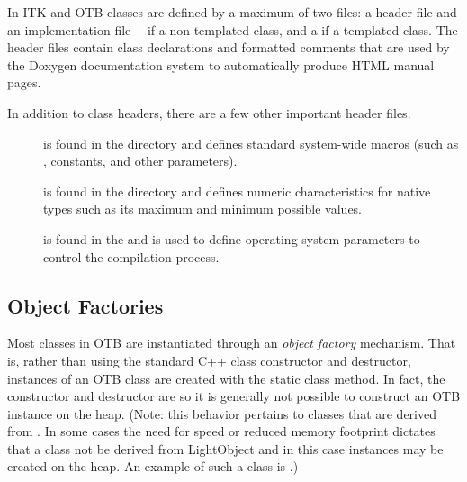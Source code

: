In ITK and OTB classes are defined by a maximum of two files: a header  file
and an implementation file--- if a non-templated class, and a
 if a templated class.
The header files contain class declarations
and formatted comments that are used by the Doxygen documentation
system to automatically produce HTML manual pages.

In addition to class headers, there are a few other important header files.
\begin{description}
        \item[] is found in the
         directory
        and defines standard system-wide macros (such as ,
        constants, and other parameters).

        \item[] is found in the 
        directory and defines numeric characteristics for native types such
        as its maximum and minimum possible values.

        \item[] is found in the 
        and is used to define operating system parameters to control
        the compilation process.
\end{description}

\subsection{Object Factories}
\label{sec:ObjectFactories}


Most classes in OTB are instantiated through an \emph{object factory}
mechanism. That is, rather than using the standard C++ class constructor and
destructor, instances of an OTB class are created with the static class
 method. In fact, the constructor and destructor are
 so it is generally not possible to construct an OTB
instance on the heap. (Note: this behavior pertains to classes that are
derived from . In some cases the need for speed or
reduced memory footprint dictates that a class not be derived from
LightObject and in this case instances may be created on the heap. An
example of such a class is .)


